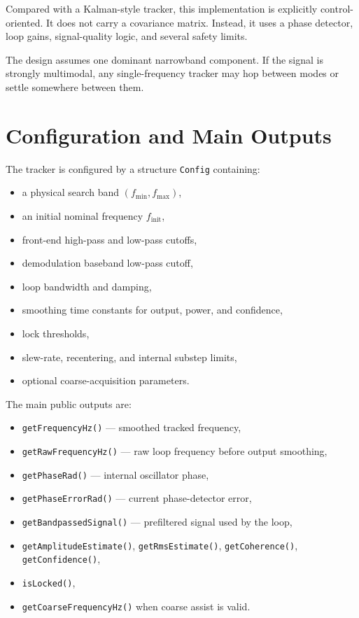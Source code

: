 \documentclass[conference]{IEEEtran}
\begin{document}
    Compared with a Kalman-style tracker, this implementation is explicitly
    control-oriented. It does not carry a covariance matrix. Instead, it uses a
    phase detector, loop gains, signal-quality logic, and several safety limits.

    The design assumes one dominant narrowband component. If the signal is
    strongly multimodal, any single-frequency tracker may hop between modes or
    settle somewhere between them.

    \section{Configuration and Main Outputs}

    The tracker is configured by a structure \texttt{Config} containing:
    \begin{itemize}[leftmargin=1.4em]
        \item a physical search band \((f_{\min}, f_{\max})\),
        \item an initial nominal frequency \(f_{\mathrm{init}}\),
        \item front-end high-pass and low-pass cutoffs,
        \item demodulation baseband low-pass cutoff,
        \item loop bandwidth and damping,
        \item smoothing time constants for output, power, and confidence,
        \item lock thresholds,
        \item slew-rate, recentering, and internal substep limits,
        \item optional coarse-acquisition parameters.
    \end{itemize}

    The main public outputs are:
    \begin{itemize}[leftmargin=1.4em]
        \item \texttt{getFrequencyHz()} --- smoothed tracked frequency,
        \item \texttt{getRawFrequencyHz()} --- raw loop frequency before output smoothing,
        \item \texttt{getPhaseRad()} --- internal oscillator phase,
        \item \texttt{getPhaseErrorRad()} --- current phase-detector error,
        \item \texttt{getBandpassedSignal()} --- prefiltered signal used by the loop,
        \item \texttt{getAmplitudeEstimate()}, \texttt{getRmsEstimate()},
        \texttt{getCoherence()}, \texttt{getConfidence()},
        \item \texttt{isLocked()},
        \item \texttt{getCoarseFrequencyHz()} when coarse assist is valid.
    \end{itemize}
\end{document}
